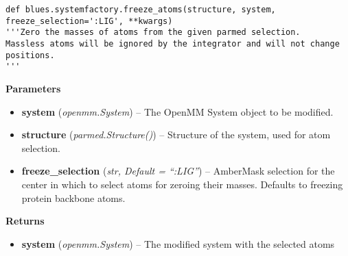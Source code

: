 \begin{description}
\begin{verbatim}
def blues.systemfactory.freeze_atoms(structure, system, freeze_selection=':LIG', **kwargs)
'''Zero the masses of atoms from the given parmed selection.
Massless atoms will be ignored by the integrator and will not change
positions.
'''
\end{verbatim}


\begin{description}
\item
    \textbf{Parameters}
\begin{itemize}
\item
  \textbf{system} (\emph{openmm.System}) -- The OpenMM System object to
  be modified.
\item
  \textbf{structure} (\emph{parmed.Structure()}) -- Structure of the
  system, used for atom selection.
\item
  \textbf{freeze\_selection} (\emph{str, Default = ``:LIG''}) --
  AmberMask selection for the center in which to select atoms for
  zeroing their masses. Defaults to freezing protein backbone atoms.
\end{itemize}
\item
    \textbf{Returns}
\begin{itemize}
    \item
        \textbf{system} (\emph{openmm.System}) -- The modified system with the selected atoms
\end{itemize}
\end{description}
\end{description}

